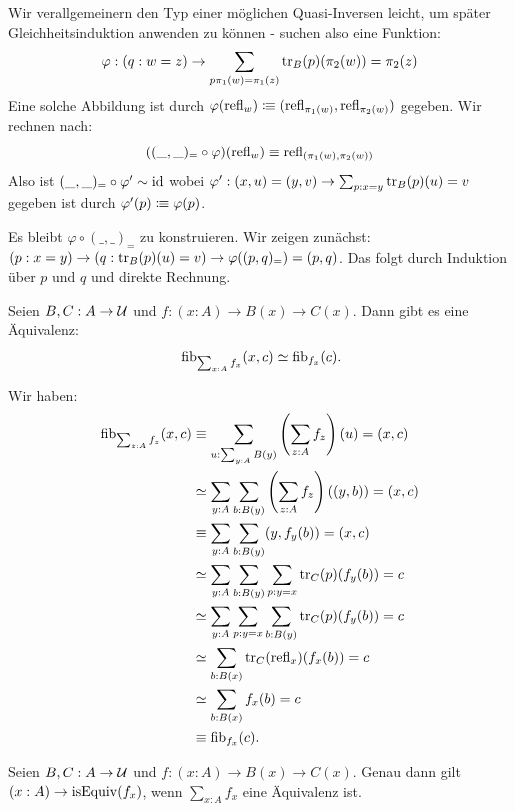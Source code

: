 \begin{beweis}
  Wir verallgemeinern den Typ einer möglichen Quasi-Inversen leicht, um später Gleichheitsinduktion anwenden zu können - suchen also eine Funktion:
  \[
     \varphi:(q:w=z) \to \sum_{p\pi_1(w)=\pi_1(z)}\mathrm{tr}_B(p)(\pi_2(w))=\pi_2(z)
  \]
  Eine solche Abbildung ist durch $\varphi(\mathrm{refl}_w)\vcentcolon\mspace{-1.2mu}\equiv (\mathrm{refl}_{\pi_1(w)},\mathrm{refl}_{\pi_2(w)})$ gegeben.
  Wir rechnen nach: \[((\_,\_)_=\circ \varphi)(\mathrm{refl}_{w})\equiv \mathrm{refl}_{(\pi_1(w),\pi_2(w))} \]
  Also ist $(\_,\_)_=\circ \varphi'\sim\mathrm{id}$ wobei $\varphi': (x,u)=(y,v)\to \sum_{p:x=y}\mathrm{tr}_B(p)(u)=v$ gegeben ist durch $\varphi'(p)\vcentcolon\mspace{-1.2mu}\equiv \varphi(p)$.

  Es bleibt $\varphi\circ (\_,\_)_=$ zu konstruieren.
  Wir zeigen zunächst: $(p:x=y)\to (q:\mathrm{tr}_B(p)(u)=v)\to \varphi((p,q)_=)=(p,q)$.
  Das folgt durch Induktion über $p$ und $q$ und direkte Rechnung.
\end{beweis}

\begin{lemma}
  \label{total-fiberwise-sigma-equiv}
  Seien $B,C:A\to\mathcal{U}$ und $f:(x:A)\to B(x)\to C(x)$.
  Dann gibt es eine Äquivalenz:
  \[
    \fib_{\sum_{x:A}f_x}(x,c)\simeq \fib_{f_x}(c)\rlap{.}
  \]
\end{lemma}

\begin{beweis}
  Wir haben:
  \begin{align*}
    \fib_{\sum_{z:A}f_z}(x,c)&\equiv\sum_{u:\sum_{y:A}B(y)}\left(\sum_{z:A}f_z\right)(u)=(x,c) \\
    &\simeq\sum_{y:A}\sum_{b:B(y)}\left(\sum_{z:A}f_z\right)((y,b))=(x,c) \\
    &\equiv\sum_{y:A}\sum_{b:B(y)} (y,f_{y}(b))=(x,c) \\
    &\simeq\sum_{y:A}\sum_{b:B(y)}\sum_{p:y=x}\transp_C(p)(f_{y}(b))=c \\
    &\simeq\sum_{y:A}\sum_{p:y=x}\sum_{b:B(y)}\transp_C(p)(f_{y}(b))=c \\
    &\simeq\sum_{b:B(x)}\transp_C(\refl_x)(f_{x}(b))=c \\
    &\simeq\sum_{b:B(x)}f_{x}(b)=c \\
    &\equiv \fib_{f_x}(c)\rlap{.}
  \end{align*}
\end{beweis}

\begin{lemma}
  \label{sigma-fiberwise-equiv}
  Seien $B,C:A\to\mathcal{U}$ und $f:(x:A)\to B(x)\to C(x)$.
  Genau dann gilt $(x:A)\to \mathrm{isEquiv}(f_x)$, wenn $\sum_{x:A}f_x$ eine Äquivalenz ist.
\end{lemma}

